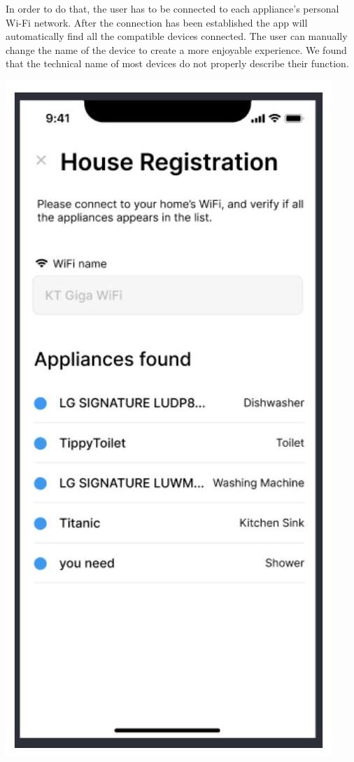 \documentclass[10pt]{article}
\begin{document}
In order to do that, the user has to be connected to each appliance's personal Wi-Fi network. After the connection has been established the app will automatically find all the compatible devices connected. The user can manually change the name of the device to create a more enjoyable experience. We found that the technical name of most devices do not properly describe their function.

\includegraphics[max width=\textwidth]{2022_11_16_e80008f3d60227bff292g-5(1)}
\end{document}
